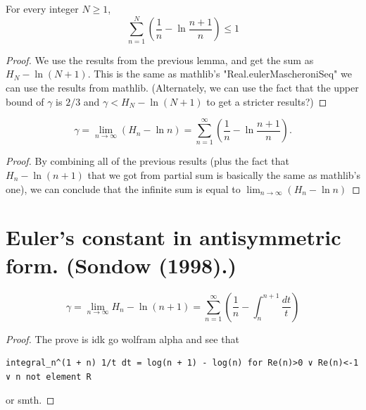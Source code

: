 \begin{theorem}
  \label{thm:eulerMascheroni_sum_bound}
  \leanok
  For every integer $N \ge 1$,
  $$
    \sum_{n=1}^{N}\left(\frac{1}{n} - \ln{\frac{n+1}{n}}\right) \leq 1
  $$
\end{theorem}

\begin{proof}
  \leanok
  We use the results from the previous lemma, and get the sum as $H_N - \ln(N + 1)$. This is the same as mathlib's "Real.eulerMascheroniSeq" we can use the results from mathlib. (Alternately, we can use the fact that the upper bound of $\gamma$ is $2/3$ and $\gamma < H_{N} - \ln (N+1)$ to get a stricter results?)
\end{proof}

\begin{theorem}
  \label{thm:eulerMascheroni_tsum}
  \leanok
  $$
    \gamma = \lim_{n \to \infty}{\left(H_{n} - \ln n\right)}
      = \sum_{n=1}^{\infty}\left(\frac{1}{n} - \ln{\frac{n+1}{n}}\right).
  $$
\end{theorem}

\begin{proof}
  \leanok
  By combining all of the previous results (plus the fact that $H_n - \ln(n+1)$ that we got from partial sum is basically the same as mathlib's one), we can conclude that the infinite sum is equal to $\lim_{n \to \infty}\left(H_{n} - \ln n\right)$
\end{proof}

\chapter{Euler's constant in antisymmetric form. (Sondow (1998).)}

\begin{lemma}
  \label{thm:eulerMascheroni_int_series}
  \leanok
  $$
    \gamma = \lim_{n \to \infty}{H_n - \ln(n+1)} = \sum_{n=1}^{\infty}{\left(\frac{1}{n} - \int_n^{n+1}{\frac{dt}{t}}\right)}
  $$
\end{lemma}

\begin{proof}
  \leanok
  The prove is idk go wolfram alpha and see that \begin{verbatim}integral_n^(1 + n) 1/t dt = log(n + 1) - log(n) for Re(n)>0 ∨ Re(n)<-1 ∨ n not element R\end{verbatim} or smth.
\end{proof}


